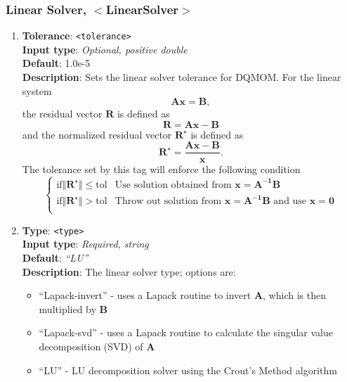 \subsubsection{Linear Solver, $<$LinearSolver$>$}
\begin{enumerate}
%
\item {\bf Tolerance}: \verb=<tolerance>= \\
{\bf Input type}: {\it Optional, positive double} \\
{\bf Default}: {\it } 1.0e-5 \\
{\bf Description}: Sets the linear solver tolerance for DQMOM.  For the linear system
%
\begin{equation}
\mathbf{Ax}=\mathbf{B},
\end{equation}
%
the residual vector $\mathbf{R}$ is defined as 
%
\begin{equation}
\mathbf{R} = \mathbf{Ax} - \mathbf{B}
\end{equation}
%
and the normalized residual vector $\mathbf{R^{\star}}$ is defined as 
%
\begin{equation}
\mathbf{R^{\star}} = \frac{ \mathbf{Ax} - \mathbf{B} }{ \mathbf{x} }.
\end{equation}
%
The tolerance set by this tag will enforce the following condition
%
\begin{equation}
\begin{cases}
\text{if} \Vert \mathbf{R^{\star}} \Vert \leq \text{tol} & \text{Use solution obtained from } \mathbf{x} = \mathbf{A^{-1}B} \\
\text{if} \Vert \mathbf{R^{\star}} \Vert > \text{tol} & \text{Throw out solution from } \mathbf{x} = \mathbf{A^{-1}B} \text{ and use } \mathbf{x = 0} \\
\end{cases}
\end{equation}
%
\item {\bf Type}: \verb=<type>= \\
{\bf Input type}: {\it Required, string} \\
{\bf Default}: {\it ``LU''} \\
{\bf Description}: The linear solver type; options are:
\begin{itemize}
\item ``Lapack-invert'' - uses a Lapack routine to invert $\mathbf{A}$, which is then multiplied by $\mathbf{B}$
\item ``Lapack-svd'' - uses a Lapack routine to calculate the singular value decomposition (SVD) of $\mathbf{A}$
\item ``LU'' - LU decomposition solver using the Crout's Method algorithm

\end{itemize}
\end{enumerate}
